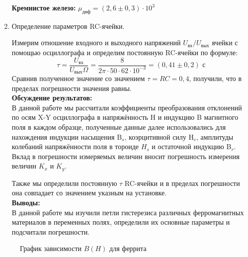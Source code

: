 \documentclass[a4paper, 12pt]{article}%
\begin{document}
\begin{enumerate}
	\textbf{Кремнистое железо: }
	   $\mu_{\text{диф}} = (2,6 \pm 0,3)\cdot 10^3$\\
	
	
	
	\item Определение параметров RC-ячейки.
	
	Измерим отношение входного и выходного напряжений $ U_{\text{вх}}/U_{\text{вых}}$ ячейки с помощью осциллографа и определим постоянную RC-ячейки по формуле:
	\begin{equation}
		\tau=\dfrac{U_{\text{вх}}}{U_{\text{вых}}\Omega} = \frac{8}{2\pi\cdot 50\cdot 62\cdot10^{-3}} = (0,41 \pm 0,2)\text{ с}
	\end{equation}
	Сравнив полученное значение со значением $\tau = RC = 0,4$,
	получили, что в пределах погрешности значения равны.\\
	
	\textbf{Обсуждение результатов: }\\
	
	 В данной работе мы рассчитали коэффициенты преобразования отклонений по осям X-Y осциллографа в напряжённость H и индукцию B магнитного поля в каждом образце, полученные данные далее использовались для нахождения индукции насыщения B$_s$, коэрцитивной силу H$_c$, амплитуды колебаний напряжённости поля в тороиде $H_s$ и остаточной индукцию B$_r$.
	 Вклад в погрешности измеряемых величин вносит погрешность измерения величин $K_x$ и $K_y$. 
	 
	 Также мы определили постоянную $\tau$ RC-ячейки и в пределах погрешности она совпадает со значением указным на установке.\\
	 
	 \textbf{Выводы: }\\
	 
	 	В данной работе мы изучили петли гистерезиса различных ферромагнитных материалов в переменных полях, определили их основные параметры и подсчитали погрешности.
	 
	 
	\end{enumerate}
	
	
		\begin{figure}[h]
		\caption{График зависимости $B(H)$ для феррита}
	\end{figure}
	
\end{document}
